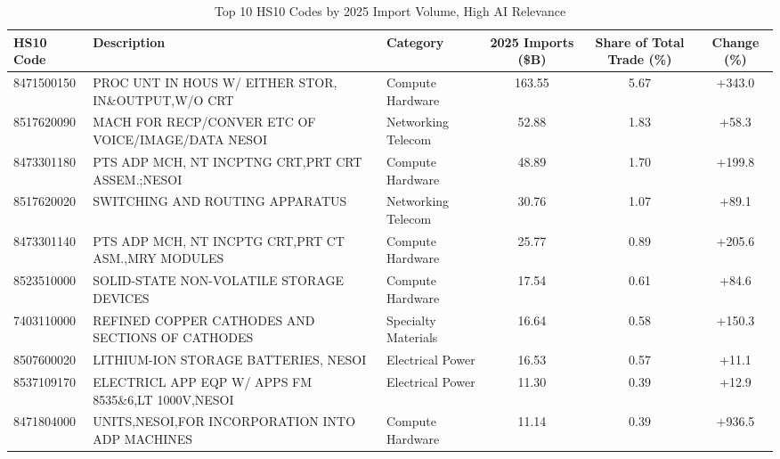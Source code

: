 \begin{table}[htbp]
\centering
\small
\caption{Top 10 HS10 Codes by 2025 Import Volume, High AI Relevance}
\label{tab:top10_high_relevance}
\setlength{\tabcolsep}{1.25mm}
\renewcommand{\arraystretch}{1.80}
\begin{tabular}{lp{5cm}lccc}
\toprule
HS10 Code & Description & Category & 2025 Imports (\$B) & Share of Total Trade (\%) & Change (\%) \\
\midrule
8471500150 & {\footnotesize PROC UNT IN HOUS W/ EITHER STOR, IN\&OUTPUT,W/O CRT} & Compute Hardware & 163.55 & 5.67 & +343.0 \\
8517620090 & {\footnotesize MACH FOR RECP/CONVER ETC OF VOICE/IMAGE/DATA NESOI} & Networking Telecom & 52.88 & 1.83 & +58.3 \\
8473301180 & {\footnotesize PTS ADP MCH, NT INCPTNG CRT,PRT CRT ASSEM.;NESOI} & Compute Hardware & 48.89 & 1.70 & +199.8 \\
8517620020 & {\footnotesize SWITCHING AND ROUTING APPARATUS} & Networking Telecom & 30.76 & 1.07 & +89.1 \\
8473301140 & {\footnotesize PTS ADP MCH, NT INCPTG CRT,PRT CT ASM.,MRY MODULES} & Compute Hardware & 25.77 & 0.89 & +205.6 \\
8523510000 & {\footnotesize SOLID-STATE NON-VOLATILE STORAGE DEVICES} & Compute Hardware & 17.54 & 0.61 & +84.6 \\
7403110000 & {\footnotesize REFINED COPPER CATHODES AND SECTIONS OF CATHODES} & Specialty Materials & 16.64 & 0.58 & +150.3 \\
8507600020 & {\footnotesize LITHIUM-ION STORAGE BATTERIES, NESOI} & Electrical Power & 16.53 & 0.57 & +11.1 \\
8537109170 & {\footnotesize ELECTRICL APP EQP W/ APPS FM 8535\&6,LT 1000V,NESOI} & Electrical Power & 11.30 & 0.39 & +12.9 \\
8471804000 & {\footnotesize UNITS,NESOI,FOR INCORPORATION INTO ADP MACHINES} & Compute Hardware & 11.14 & 0.39 & +936.5 \\
\bottomrule
\end{tabular}
\end{table}
